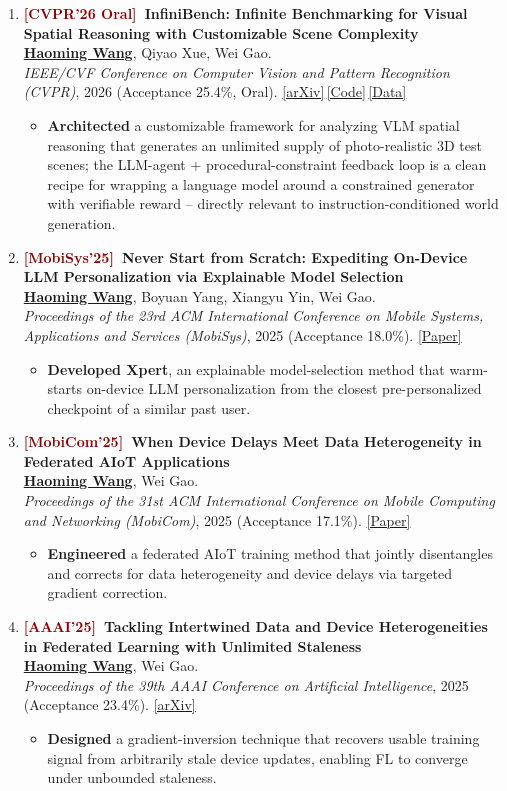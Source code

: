 \documentclass[11pt, letterpaper]{article}
\newenvironment{publist}{
  \begin{enumerate}[leftmargin=1.7em, itemsep=4pt, parsep=0pt, topsep=2pt, label=\arabic*.]
}{\end{enumerate}}
\newcommand{\impactbullet}[1]{%
  \par\vspace{1pt}%
  \begin{itemize}[leftmargin=1.2em, topsep=0pt, itemsep=0pt, parsep=0pt, partopsep=0pt]
    \item #1
  \end{itemize}}
\newcommand{\me}{\underline{\textbf{Haoming Wang}}}
\begin{document}
\begin{publist}
\item \textbf{\textcolor{darkred}{[CVPR'26 Oral]}\ InfiniBench: Infinite Benchmarking for Visual Spatial Reasoning with Customizable Scene Complexity}\\
\me, Qiyao Xue, Wei Gao.\\
\textit{IEEE/CVF Conference on Computer Vision and Pattern Recognition (CVPR)}, 2026 (Acceptance 25.4\%, Oral). \href{https://arxiv.org/abs/2511.18200}{[arXiv]}\,\href{https://github.com/pittisl/infinibench}{[Code]}\,\href{https://huggingface.co/datasets/Haoming645/infinibench}{[Data]}
\impactbullet{\textbf{Architected} a customizable framework for analyzing VLM spatial reasoning that generates an unlimited supply of photo-realistic 3D test scenes; the LLM-agent + procedural-constraint feedback loop is a clean recipe for wrapping a language model around a constrained generator with verifiable reward -- directly relevant to instruction-conditioned world generation.}

\item \textbf{\textcolor{darkred}{[MobiSys'25]}\ Never Start from Scratch: Expediting On-Device LLM Personalization via Explainable Model Selection}\\
\me, Boyuan Yang, Xiangyu Yin, Wei Gao.\\
\textit{Proceedings of the 23rd ACM International Conference on Mobile Systems, Applications and Services (MobiSys)}, 2025 (Acceptance 18.0\%). \href{https://haomingwang645.github.io/pdfs/xpert_paper.pdf}{[Paper]}
\impactbullet{\textbf{Developed Xpert}, an explainable model-selection method that warm-starts on-device LLM personalization from the closest pre-personalized checkpoint of a similar past user.}

\item \textbf{\textcolor{darkred}{[MobiCom'25]}\ When Device Delays Meet Data Heterogeneity in Federated AIoT Applications}\\
\me, Wei Gao.\\
\textit{Proceedings of the 31st ACM International Conference on Mobile Computing and Networking (MobiCom)}, 2025 (Acceptance 17.1\%). \href{https://haomingwang645.github.io/pdfs/feddc_paper.pdf}{[Paper]}
\impactbullet{\textbf{Engineered} a federated AIoT training method that jointly disentangles and corrects for data heterogeneity and device delays via targeted gradient correction.}

\item \textbf{\textcolor{darkred}{[AAAI'25]}\ Tackling Intertwined Data and Device Heterogeneities in Federated Learning with Unlimited Staleness}\\
\me, Wei Gao.\\
\textit{Proceedings of the 39th AAAI Conference on Artificial Intelligence}, 2025 (Acceptance 23.4\%). \href{https://arxiv.org/abs/2309.13536}{[arXiv]}
\impactbullet{\textbf{Designed} a gradient-inversion technique that recovers usable training signal from arbitrarily stale device updates, enabling FL to converge under unbounded staleness.}
\end{publist}
\end{document}
